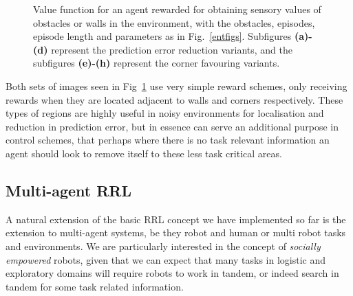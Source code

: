 \documentclass{article}
\begin{document}
\begin{figure}[ht]
\caption{Value function for an agent rewarded for obtaining sensory values of obstacles or walls in the environment, with the obstacles, episodes, episode length and parameters as in Fig.~\ref{entfigs}. Subfigures \textbf{(a)-(d)} represent the prediction error reduction variants, and the subfigures \textbf{(e)-(h)} represent the corner favouring variants.\label{othervariants}}
\end{figure}

Both sets of images seen in Fig~\ref{othervariants} use very simple reward schemes, only receiving rewards when they are located adjacent to walls and corners respectively. These types of regions are highly useful in noisy environments for localisation and reduction in prediction error, but in essence can serve an additional purpose in control schemes, that perhaps where there is no task relevant information an agent should look to remove itself to these less task critical areas. %

\subsection{Multi-agent RRL}
\label{sharedspace}
A natural extension of the basic RRL concept we have implemented so far is the extension to multi-agent systems, be they robot and human or multi robot tasks and environments. We are particularly interested in the concept of \emph{socially empowered} robots, given that we can expect that many tasks in logistic and exploratory domains will require robots to work in tandem, or indeed search in tandem for some task related information.
\end{document}
